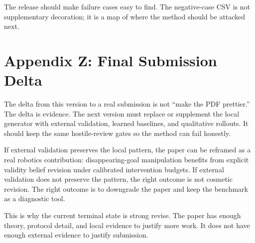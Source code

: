 \documentclass{article}
\begin{document}
The release should make failure cases easy to find. The negative-case CSV is not supplementary decoration; it is a map of where the method should be attacked next.

\section{Appendix Z: Final Submission Delta}
The delta from this version to a real submission is not ``make the PDF prettier.'' The delta is evidence. The next version must replace or supplement the local generator with external validation, learned baselines, and qualitative rollouts. It should keep the same hostile-review gates so the method can fail honestly.

If external validation preserves the local pattern, the paper can be reframed as a real robotics contribution: disappearing-goal manipulation benefits from explicit validity belief revision under calibrated intervention budgets. If external validation does not preserve the pattern, the right outcome is not cosmetic revision. The right outcome is to downgrade the paper and keep the benchmark as a diagnostic tool.

This is why the current terminal state is strong revise. The paper has enough theory, protocol detail, and local evidence to justify more work. It does not have enough external evidence to justify submission.

\begingroup
\raggedright


\endgroup
\end{document}
